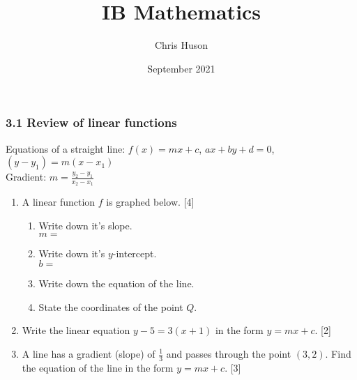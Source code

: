 \documentclass[12pt, twoside]{article}
\title{IB Mathematics}
\author{Chris Huson}
\date{September 2021}
\begin{document}
\subsubsection*{3.1 Review of linear functions}
Equations of a straight line: $f(x)=mx+c$, $ax+by+d=0$, $(y-y_1)=m(x-x_1)$\\[0.25cm]
Gradient: $\displaystyle m=\frac{y_2-y_1}{x_2-x_1}$ \vspace{1cm}
\begin{enumerate}
\item A linear function $f$ is graphed below. \hfill [4]
\begin{multicols}{2}
\begin{enumerate}
  \item Write down it's slope.\\ $m=$
  \vspace{0.25cm}
  \item Write down it's $y$-intercept.\\ $b=$
  \vspace{0.25cm}
  \item Write down the equation of the line.
  \vspace{1cm}
  \item State the coordinates of the point $Q$.
\end{enumerate} \vspace{.5cm}
  \begin{center} 
  \end{center}
\end{multicols}

\item Write the linear equation $y-5=3(x+1)$ in the form $y=mx+c$.  \hfill [2]\vspace{4cm}

\item A line has a gradient (slope) of $\displaystyle \frac{1}{3}$ and passes through the point $(3, 2)$. Find the equation of the line in the form $y=mx+c$. \hfill [3]


\end{enumerate}
\end{document}
